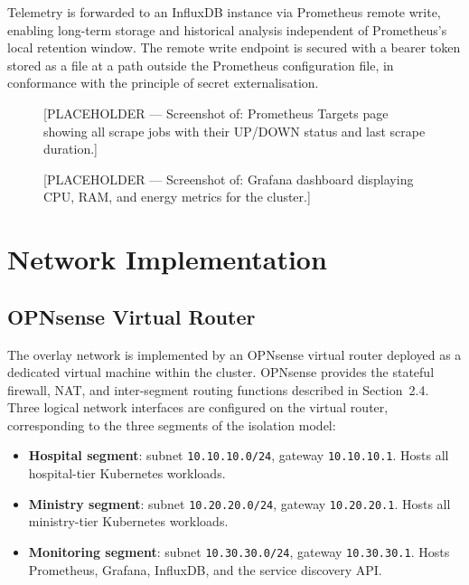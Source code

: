 \documentclass[12pt,a4paper]{report}
\begin{document}
Telemetry is forwarded to an InfluxDB instance via Prometheus remote write,
enabling long-term storage and historical analysis independent of Prometheus's
local retention window. The remote write endpoint is secured with a bearer token
stored as a file at a path outside the Prometheus configuration file, in conformance
with the principle of secret externalisation.

\begin{figure}[htbp]
\centering
\fbox{\rule{0pt}{4cm}\rule{0.9\linewidth}{0pt}}
\caption{[PLACEHOLDER --- Screenshot of: Prometheus Targets page showing all
scrape jobs with their UP/DOWN status and last scrape duration.]}
\label{fig:placeholder_prom_targets}
\end{figure}

\begin{figure}[htbp]
\centering
\fbox{\rule{0pt}{4.5cm}\rule{0.9\linewidth}{0pt}}
\caption{[PLACEHOLDER --- Screenshot of: Grafana dashboard displaying CPU, RAM,
and energy metrics for the cluster.]}
\label{fig:placeholder_grafana}
\end{figure}

\section{Network Implementation}

\subsection{OPNsense Virtual Router}

The overlay network is implemented by an OPNsense virtual router deployed as a
dedicated virtual machine within the cluster. OPNsense provides the stateful
firewall, NAT, and inter-segment routing functions described in Section~2.4. Three
logical network interfaces are configured on the virtual router, corresponding to the
three segments of the isolation model:

\begin{itemize}
  \item \textbf{Hospital segment}: subnet \texttt{10.10.10.0/24}, gateway \texttt{10.10.10.1}. Hosts all hospital-tier Kubernetes workloads.
  \item \textbf{Ministry segment}: subnet \texttt{10.20.20.0/24}, gateway \texttt{10.20.20.1}. Hosts all ministry-tier Kubernetes workloads.
  \item \textbf{Monitoring segment}: subnet \texttt{10.30.30.0/24}, gateway \texttt{10.30.30.1}. Hosts Prometheus, Grafana, InfluxDB, and the service discovery API.
\end{itemize}
\end{document}
